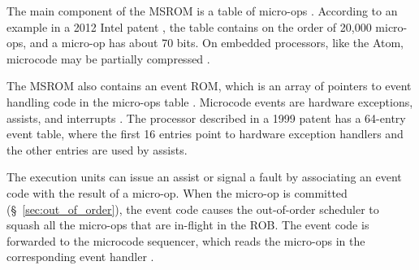 The main component of the MSROM is a table of micro-ops \cite{intel2008genetic,
intel2012clusters}. According to an example in a 2012 Intel patent
\cite{intel2012clusters}, the table contains on the order of 20,000 micro-ops,
and a micro-op has about 70 bits. On embedded processors, like the Atom,
microcode may be partially compressed
\cite{intel2008genetic, intel2012clusters}.


The MSROM also contains an event ROM, which is an array of pointers to event
handling code in the micro-ops table \cite{intel1999events}. Microcode events
are hardware exceptions, assists, and interrupts \cite{intel1997events,
intel1999exceptions, intel2007microstack}. The processor described in a 1999
patent \cite{intel1999events} has a 64-entry event table, where the first 16
entries point to hardware exception handlers and the other entries are used by
assists.


The execution units can issue an assist or signal a fault by associating an
event code with the result of a micro-op. When the micro-op is committed
(\S~\ref{sec:out_of_order}), the event code causes the out-of-order scheduler
to squash all the micro-ops that are in-flight in the ROB. The event code is
forwarded to the microcode sequencer, which reads the micro-ops in the
corresponding event handler \cite{intel1997events, intel1999exceptions}.

